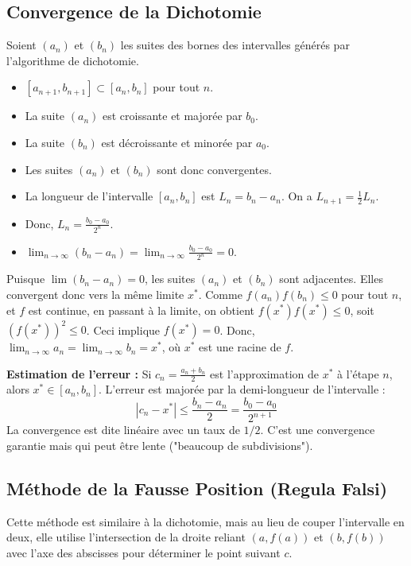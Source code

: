 \documentclass{article}
\begin{document}
\subsection{Convergence de la Dichotomie} %
Soient $(a_n)$ et $(b_n)$ les suites des bornes des intervalles générés par l'algorithme de dichotomie.
\begin{itemize}
    \item $[a_{n+1}, b_{n+1}] \subset [a_n, b_n]$ pour tout $n$.
    \item La suite $(a_n)$ est croissante et majorée par $b_0$.
    \item La suite $(b_n)$ est décroissante et minorée par $a_0$.
    \item Les suites $(a_n)$ et $(b_n)$ sont donc convergentes.
    \item La longueur de l'intervalle $[a_n, b_n]$ est $L_n = b_n - a_n$. On a $L_{n+1} = \frac{1}{2} L_n$.
    \item Donc, $L_n = \frac{b_0 - a_0}{2^n}$.
    \item $\lim_{n \to \infty} (b_n - a_n) = \lim_{n \to \infty} \frac{b_0 - a_0}{2^n} = 0$.
\end{itemize}
Puisque $\lim (b_n - a_n) = 0$, les suites $(a_n)$ et $(b_n)$ sont adjacentes. Elles convergent donc vers la même limite $x^*$.
Comme $f(a_n)f(b_n) \le 0$ pour tout $n$, et $f$ est continue, en passant à la limite, on obtient $f(x^*)f(x^*) \le 0$, soit $(f(x^*))^2 \le 0$. Ceci implique $f(x^*) = 0$.
Donc, $\lim_{n \to \infty} a_n = \lim_{n \to \infty} b_n = x^*$, où $x^*$ est une racine de $f$.

\textbf{Estimation de l'erreur :}
Si $c_n = \frac{a_n+b_n}{2}$ est l'approximation de $x^*$ à l'étape $n$, alors $x^* \in [a_n, b_n]$.
L'erreur est majorée par la demi-longueur de l'intervalle :
\[ |c_n - x^*| \le \frac{b_n - a_n}{2} = \frac{b_0 - a_0}{2^{n+1}} \]
La convergence est dite linéaire avec un taux de $1/2$. C'est une convergence garantie mais qui peut être lente ("beaucoup de subdivisions").
\par

\subsection{Méthode de la Fausse Position (Regula Falsi)} %
Cette méthode est similaire à la dichotomie, mais au lieu de couper l'intervalle en deux, elle utilise l'intersection de la droite reliant $(a, f(a))$ et $(b, f(b))$ avec l'axe des abscisses pour déterminer le point suivant $c$.
\end{document}
